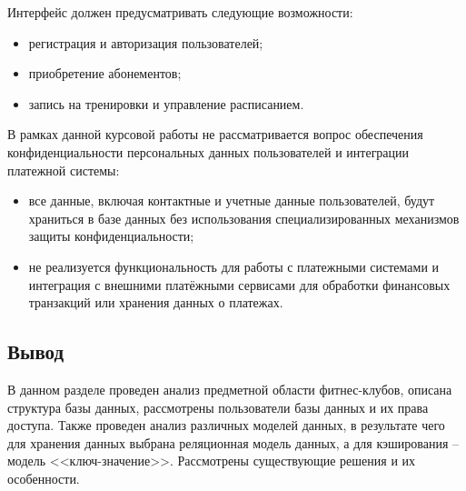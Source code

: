 Интерфейс должен предусматривать следующие возможности:
\begin{itemize}
	\item регистрация и авторизация пользователей;
	\item приобретение абонементов;
	\item запись на тренировки и управление расписанием.
\end{itemize}

В рамках данной курсовой работы не рассматривается вопрос обеспечения конфиденциальности персональных данных пользователей и интеграции платежной системы:
\begin{itemize}
	\item все данные, включая контактные и учетные данные пользователей, будут храниться в базе данных без использования специализированных механизмов защиты конфиденциальности;
	\item не реализуется функциональность для работы с платежными системами и интеграция с внешними платёжными сервисами для обработки финансовых транзакций или хранения данных о платежах.
\end{itemize}

\subsection*{Вывод}

В данном разделе проведен анализ предметной области фитнес-клубов, описана структура базы данных, рассмотрены пользователи базы данных и их права доступа. Также проведен анализ различных моделей данных, в результате чего для хранения данных выбрана реляционная модель данных, а для кэширования -- модель <<ключ-значение>>. Рассмотрены существующие решения и их особенности.
